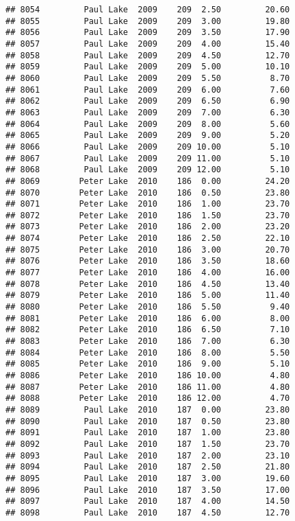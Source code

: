 \documentclass[
]{article}
\begin{document}
\begin{verbatim}
## 8054         Paul Lake  2009    209  2.50         20.60
## 8055         Paul Lake  2009    209  3.00         19.80
## 8056         Paul Lake  2009    209  3.50         17.90
## 8057         Paul Lake  2009    209  4.00         15.40
## 8058         Paul Lake  2009    209  4.50         12.70
## 8059         Paul Lake  2009    209  5.00         10.10
## 8060         Paul Lake  2009    209  5.50          8.70
## 8061         Paul Lake  2009    209  6.00          7.60
## 8062         Paul Lake  2009    209  6.50          6.90
## 8063         Paul Lake  2009    209  7.00          6.30
## 8064         Paul Lake  2009    209  8.00          5.60
## 8065         Paul Lake  2009    209  9.00          5.20
## 8066         Paul Lake  2009    209 10.00          5.10
## 8067         Paul Lake  2009    209 11.00          5.10
## 8068         Paul Lake  2009    209 12.00          5.10
## 8069        Peter Lake  2010    186  0.00         24.20
## 8070        Peter Lake  2010    186  0.50         23.80
## 8071        Peter Lake  2010    186  1.00         23.70
## 8072        Peter Lake  2010    186  1.50         23.70
## 8073        Peter Lake  2010    186  2.00         23.20
## 8074        Peter Lake  2010    186  2.50         22.10
## 8075        Peter Lake  2010    186  3.00         20.70
## 8076        Peter Lake  2010    186  3.50         18.60
## 8077        Peter Lake  2010    186  4.00         16.00
## 8078        Peter Lake  2010    186  4.50         13.40
## 8079        Peter Lake  2010    186  5.00         11.40
## 8080        Peter Lake  2010    186  5.50          9.40
## 8081        Peter Lake  2010    186  6.00          8.00
## 8082        Peter Lake  2010    186  6.50          7.10
## 8083        Peter Lake  2010    186  7.00          6.30
## 8084        Peter Lake  2010    186  8.00          5.50
## 8085        Peter Lake  2010    186  9.00          5.10
## 8086        Peter Lake  2010    186 10.00          4.80
## 8087        Peter Lake  2010    186 11.00          4.80
## 8088        Peter Lake  2010    186 12.00          4.70
## 8089         Paul Lake  2010    187  0.00         23.80
## 8090         Paul Lake  2010    187  0.50         23.80
## 8091         Paul Lake  2010    187  1.00         23.80
## 8092         Paul Lake  2010    187  1.50         23.70
## 8093         Paul Lake  2010    187  2.00         23.10
## 8094         Paul Lake  2010    187  2.50         21.80
## 8095         Paul Lake  2010    187  3.00         19.60
## 8096         Paul Lake  2010    187  3.50         17.00
## 8097         Paul Lake  2010    187  4.00         14.50
## 8098         Paul Lake  2010    187  4.50         12.70

\end{verbatim}
\end{document}

